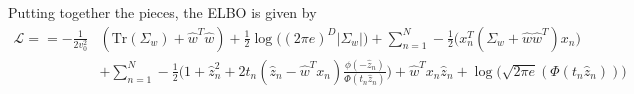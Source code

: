 \documentclass{article}
\begin{document}

Putting together the pieces, the ELBO is given by
\begin{align*}
\mathcal L = 
= - \frac{1}{2v_0^2}& (\text{Tr}(\Sigma_w) + \hat w^T \hat w) 
+  \frac{1}{2}\log \big((2\pi e)^D |\Sigma_w|) 
+ \sum_{n=1}^N - \frac{1}{2} \Big(x_n^T(\Sigma_w + \hat w \hat w^T)x_n\Big) \\
&+\sum_{n=1}^N
 -\frac{1}{2}\Big(1 + \hat z_n^2  + 2t_n(\hat z_n-\hat w^Tx_n) \frac{\phi(-\hat z_n)}{\Phi(t_n\hat z_n)}\Big) 
 + \hat w^Tx_n\hat z_n 
 + \log\Big(\sqrt{2\pi e} (\Phi(t_n\hat z_n))\Big) 
\end{align*}
\end{document}
